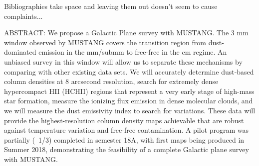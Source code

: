 \documentclass[11pt,preprint]{aastex_nofoot}
\begin{document}

\clearpage
{\color{red} Bibliographies take space and leaving them out doesn't seem to cause complaints...}
\footnotesize\raggedright
\noindent 

%
\normalsize
%


ABSTRACT:
We propose a Galactic Plane survey with MUSTANG.  The 3 mm window observed by
MUSTANG covers the transition region from dust-dominated emission in the
mm/submm to free-free in the cm regime.  An unbiased survey in this window will
allow us to separate these mechanisms by comparing with other existing data
sets.  We will accurately determine dust-based column densities at 8 arcsecond
resolution,  search for extremely dense hypercompact HII (HCHII) regions that
represent a very early stage of high-mass star formation, measure the ionizing
flux emission in dense molecular clouds, and we will measure the
dust emissivity index to search for variations. These data will provide the
highest-resolution column density maps achievable that are robust against
temperature variation and free-free contamination.  A pilot program was
partially (~1/3) completed in semester 18A, with first maps being produced in
Summer 2018, demonstrating the feasibility of a complete Galactic plane survey
with MUSTANG.


\end{document}
